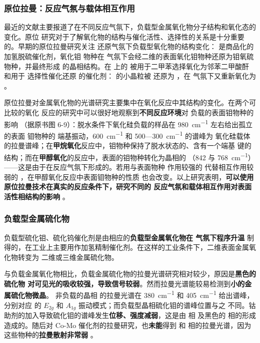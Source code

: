 \subsubsection{原位拉曼：反应气氛与载体相互作用}

最近的文献主要报道了在不同反应气氛下，负载型金属氧化物分子结构和氧化态的变化。原位
研究对于了解氧化物的结构与催化活性、选择性的关系是十分重要的。早期的原位拉曼研究关注
还原气氛下负载型氧化物的结构变化： 是商品化的加氢脱硫催化剂，氧化钼
物种在  气氛下会经二维的表面氧化钼物种还原为钼氧硫物种，并最终形成
 的晶相结构。在  上的  被用于二甲苯选择氧化为邻苯二甲酸酐
和用于  选择性催化还原  的催化剂： 的小晶粒被 
还原为 ，在  气氛下又重新氧化为 
。

原位拉曼对金属氧化物的光谱研究主要集中在氧化反应中其结构的变化。在两个可比较的氧化
反应的研究中可以很好地观察到\textbf{不同反应环境}对  负载的表面钼物种的影响
（据原书图 6-9）：脱水条件下氧化硅负载的样品在 \qty{980}{cm^{-1}} 左右给出孤立的表面
钼物种的  端基振动，\qty{600}{cm^{-1}} 和 500—\qty{300}{cm^{-1}} 的谱峰为
氧化硅载体的拉曼谱峰；在\textbf{甲烷氧化}反应中，钼物种保持了脱水状态的、含有一个端基
 键的结构；而在\textbf{甲醇氧化}的反应中，表面的钼物种转化为晶相的
（842 与 \qty{768}{cm^{-1}}）——这是由于在反应气氛下形成的。若用与表面物种
作用较强的  代替相互作用较弱的 ，在甲醇氧化反应中表面钼物种的性质
也会改变。以上研究表明，\textbf{可以使用原位拉曼技术在真实的反应条件下，研究不同的
反应气氛和载体相互作用对表面活性相结构的影响}
。

\subsubsection{负载型金属硫化物}

负载型硫化钼、硫化钨催化剂是由相应的\textbf{负载型金属氧化物在  气氛下程序升温}
制得的，在工业上主要用作加氢精制催化剂。在这样的工业条件下，二维表面金属氧化物转变为
二维或三维金属硫化物。

与负载金属氧化物相比，负载金属硫化物的拉曼光谱研究相对较少，原因是\textbf{黑色的硫化物
对可见光的吸收较强，导致信号较弱}。然而拉曼光谱能较易检测到\textbf{小的金属硫化物微晶}。
非负载的晶相  的拉曼光谱在 \qty{380}{cm^{-1}} 和 \qty{405}{cm^{-1}} 给出谱峰，
分别对应  的 $E_{2g}$ 和 $A_{1g}$ 振动模式；而负载型晶相硫化钼的谱峰位置与之
不同。钴助剂的加入导致硫化钼的谱峰发生\textbf{位移、强度减弱}，这是由  相
及黑色的  相的形成造成的。随后对 Co-Mo 催化剂的拉曼研究，也\textbf{未能}得到
 和  相的拉曼光谱，因为这些物种的\textbf{拉曼散射非常弱}
。

